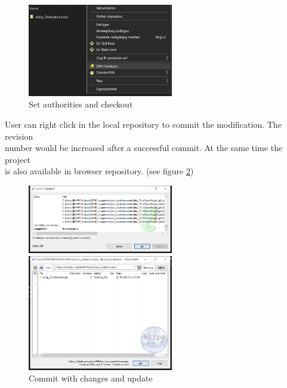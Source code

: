 \documentclass[12pt,a4paper,bibliography=totocnumbered,listof=totocnumbered]{article}
\begin{document}
\begin{enumerate}
\begin{figure}[H]
\begin{minipage}[t]{0.5\linewidth}
		\end{minipage}%
		\begin{minipage}[t]{0.5\linewidth} 
		\centering 
		\includegraphics[width=2.5in]{pics/svnCheckout.png} 
		\end{minipage} %
		\caption{Set authorities and checkout}
		\label{fig:svn03}
	\end{figure} %
	User can right click in the local repository to commit the modification. The revision\\ number would be increased after a successful commit. At the same time the project\\ is also available in browser repository. (see figure \ref{fig:svn04})
	\vspace{1em}\\
	\begin{figure}[H] 
		\begin{minipage}[t]{0.5\linewidth} 
		\centering 
		\includegraphics[width=2.5in]{pics/svnCommit.png}  
		\end{minipage}%
		\begin{minipage}[t]{0.5\linewidth} 
		\centering 
		\includegraphics[width=2.5in]{pics/svnUpdate.png} 
		\end{minipage} %
		\caption{Commit with changes and update}
		\label{fig:svn04}

\end{figure}
\end{enumerate}
\end{document}
